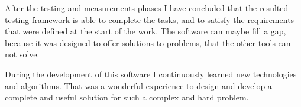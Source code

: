 After the testing and measurements phases I have concluded that the resulted testing framework is able to complete the tasks, and to satisfy the requirements that were defined at the start of the work. The software can maybe fill a gap, because it was designed to offer solutions to problems, that the other tools can not solve.

During the development of this software I continuously learned new technologies and algorithms.  That was a wonderful experience to design and develop a complete and useful solution for such a complex and hard problem.


